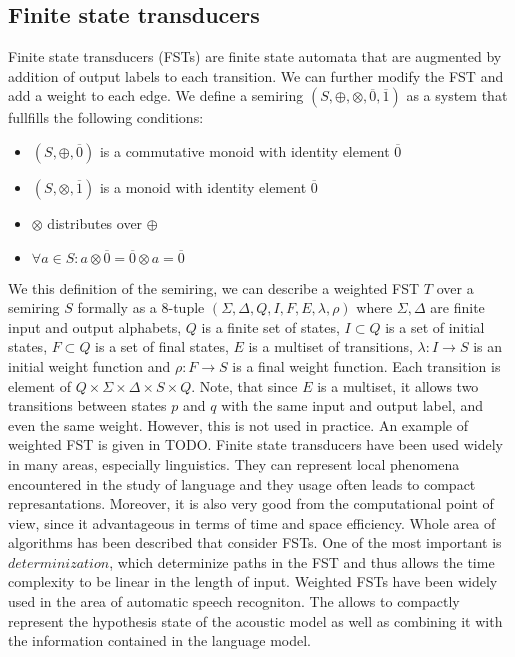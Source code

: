 \subsection{Finite state transducers\cite{mohri1997finite}}
Finite state transducers (FSTs) are finite state automata that are augmented by addition of output labels to each transition.
We can further modify the FST and add a weight to each edge.
We define a semiring $(S,\oplus,\otimes,\overline{0},\overline{1})$ as a system that fullfills the following conditions:
\begin{itemize}
\item $(S,\oplus,\overline{0})$ is a commutative monoid with identity element $\overline{0}$
\item $(S,\otimes,\overline{1})$ is a monoid with identity element $\overline{0}$
\item $\otimes $ distributes over $\oplus$
\item $\forall a \in S: a \otimes \overline{0} = \overline{0} \otimes a = \overline{0}$
\end{itemize}
We this definition of the semiring, we can describe a weighted FST\cite{mohri2009weighted} $T$ over a semiring $S$ formally as a 8-tuple $(\Sigma,\Delta,Q,I,F,E,\lambda,\rho)$ where $\Sigma, \Delta$ are finite input and output alphabets, $Q$ is a finite set of states, $I \subset Q$ is a set of initial states, $F \subset Q$ is a set of final states, $E$ is a multiset of transitions, $\lambda: I \rightarrow S$ is an initial weight function and $\rho: F \rightarrow S$ is a final weight function.
Each transition is element of $Q \times \Sigma \times \Delta \times S \times Q$.
Note, that since $E$ is a multiset, it allows two transitions between states $p$ and $q$ with the same input
and output label, and even the same weight.
However, this is not used in practice.
An example of weighted FST is given in TODO.
Finite state transducers have been used widely in many areas, especially linguistics.
They can represent local phenomena encountered in the study of language and they usage often leads to compact represantations.
Moreover, it is also very good from the computational point of view, since it advantageous in terms of time and space efficiency.
Whole area of algorithms has been described that consider FSTs.
One of the most important is $determinization$, which determinize paths in the FST and thus allows the time complexity to be linear in the length of input.
Weighted FSTs have been widely used in the area of automatic speech recogniton.
The allows to compactly represent the hypothesis state of the acoustic model as well as combining it with the information contained in the language model.
